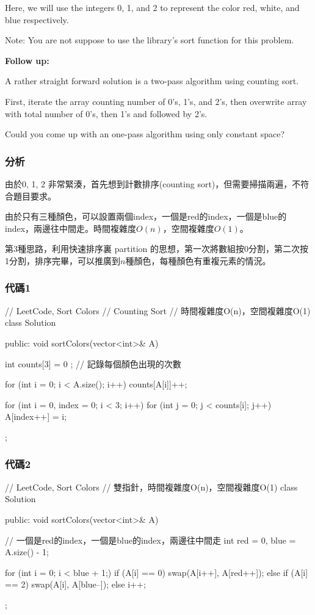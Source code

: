 Here, we will use the integers 0, 1, and 2 to represent the color red, white, and blue respectively.

Note:
You are not suppose to use the library's sort function for this problem.

\textbf{Follow up:}

A rather straight forward solution is a two-pass algorithm using counting sort.

First, iterate the array counting number of 0's, 1's, and 2's, then overwrite array with total number of 0's, then 1's and followed by 2's.

Could you come up with an one-pass algorithm using only constant space?


\subsubsection{分析}
由於0, 1, 2 非常緊湊，首先想到計數排序(counting sort)，但需要掃描兩遍，不符合題目要求。

由於只有三種顏色，可以設置兩個index，一個是red的index，一個是blue的index，兩邊往中間走。時間複雜度$O(n)$，空間複雜度$O(1)$。

第3種思路，利用快速排序裏 partition 的思想，第一次將數組按0分割，第二次按1分割，排序完畢，可以推廣到$n$種顏色，每種顏色有重複元素的情況。


\subsubsection{代碼1}
\begin{Code}
// LeetCode, Sort Colors
// Counting Sort
// 時間複雜度O(n)，空間複雜度O(1)
class Solution {
public:
    void sortColors(vector<int>& A) {
        int counts[3] = { 0 }; // 記錄每個顏色出現的次數

        for (int i = 0; i < A.size(); i++)
            counts[A[i]]++;

        for (int i = 0, index = 0; i < 3; i++)
            for (int j = 0; j < counts[i]; j++)
                A[index++] = i;

    }
};
\end{Code}


\subsubsection{代碼2}
\begin{Code}
// LeetCode, Sort Colors
// 雙指針，時間複雜度O(n)，空間複雜度O(1)
class Solution {
public:
    void sortColors(vector<int>& A) {
        // 一個是red的index，一個是blue的index，兩邊往中間走
        int red = 0, blue = A.size() - 1;

        for (int i = 0; i < blue + 1;) {
            if (A[i] == 0)
                swap(A[i++], A[red++]);
            else if (A[i] == 2)
                swap(A[i], A[blue--]);
            else
                i++;
        }
    }
};
\end{Code}


